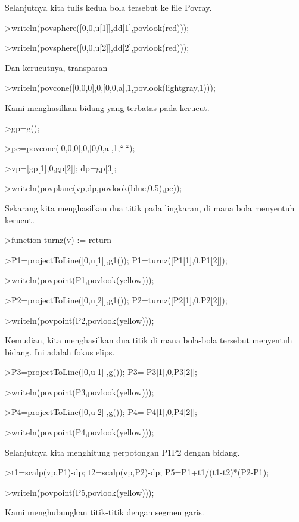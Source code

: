 \documentclass[
]{book}
\begin{document}
Selanjutnya kita tulis kedua bola tersebut ke file Povray.

\textgreater writeln(povsphere({[}0,0,u{[}1{]}{]},dd{[}1{]},povlook(red)));

\textgreater writeln(povsphere({[}0,0,u{[}2{]}{]},dd{[}2{]},povlook(red)));

Dan kerucutnya, transparan

\textgreater writeln(povcone({[}0,0,0{]},0,{[}0,0,a{]},1,povlook(lightgray,1)));

Kami menghasilkan bidang yang terbatas pada kerucut.

\textgreater gp=g();

\textgreater pc=povcone({[}0,0,0{]},0,{[}0,0,a{]},1,``\,``);

\textgreater vp={[}gp{[}1{]},0,gp{[}2{]}{]}; dp=gp{[}3{]};

\textgreater writeln(povplane(vp,dp,povlook(blue,0.5),pc));

Sekarang kita menghasilkan dua titik pada lingkaran, di mana bola menyentuh kerucut.

\textgreater function turnz(v) := return

\textgreater P1=projectToLine({[}0,u{[}1{]}{]},g1()); P1=turnz({[}P1{[}1{]},0,P1{[}2{]}{]});

\textgreater writeln(povpoint(P1,povlook(yellow)));

\textgreater P2=projectToLine({[}0,u{[}2{]}{]},g1()); P2=turnz({[}P2{[}1{]},0,P2{[}2{]}{]});

\textgreater writeln(povpoint(P2,povlook(yellow)));

Kemudian, kita menghasilkan dua titik di mana bola-bola tersebut menyentuh bidang. Ini adalah fokus elips.

\textgreater P3=projectToLine({[}0,u{[}1{]}{]},g()); P3={[}P3{[}1{]},0,P3{[}2{]}{]};

\textgreater writeln(povpoint(P3,povlook(yellow)));

\textgreater P4=projectToLine({[}0,u{[}2{]}{]},g()); P4={[}P4{[}1{]},0,P4{[}2{]}{]};

\textgreater writeln(povpoint(P4,povlook(yellow)));

Selanjutnya kita menghitung perpotongan P1P2 dengan bidang.

\textgreater t1=scalp(vp,P1)-dp; t2=scalp(vp,P2)-dp; P5=P1+t1/(t1-t2)*(P2-P1);

\textgreater writeln(povpoint(P5,povlook(yellow)));

Kami menghubungkan titik-titik dengan segmen garis.
\end{document}
